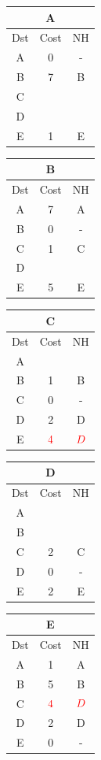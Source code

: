 \documentclass[10pt]{article}
\begin{document}
			\begin{table}[h!]
				\begin{tabular}{|c||c||c|}
					\hline
					\multicolumn{3}{|c|}{A} \\
					\hline
					Dst & Cost & NH \\
					\hline
					A & 0 & - \\
					B & 7 & B \\
					C &   &   \\
					D &   &   \\
					E & 1 & E \\
					\hline
				\end{tabular}
				\begin{tabular}{|c||c||c|}
					\hline
					\multicolumn{3}{|c|}{B} \\
					\hline
					Dst & Cost & NH \\
					\hline
					A & 7 & A \\
					B & 0 & - \\
					C & 1 & C \\
					D &   &   \\
					E & 5 & E \\
					\hline
				\end{tabular}
				\begin{tabular}{|c||c||c|}
					\hline
					\multicolumn{3}{|c|}{C} \\
					\hline
					Dst & Cost & NH \\
					\hline
					A &   &   \\
					B & 1 & B \\
					C & 0 & - \\
					D & 2 & D \\
					E & $\color{red} 4$  & $\color{red} D$ \\
					\hline
				\end{tabular}
				\begin{tabular}{|c||c||c|}
					\hline
					\multicolumn{3}{|c|}{D} \\
					\hline
					Dst & Cost & NH \\
					\hline
					A &   &   \\
					B &   &   \\
					C & 2 & C \\
					D & 0 & - \\
					E & 2 & E \\
					\hline
				\end{tabular}
				\begin{tabular}{|c||c||c|}
					\hline
					\multicolumn{3}{|c|}{E} \\
					\hline
					Dst & Cost & NH \\
					\hline
					A & 1 & A \\
					B & 5 & B \\
					C & $\color{red} 4$  & $\color{red} D$ \\
					D & 2 & D \\
					E & 0 & - \\
					\hline
				\end{tabular}
			\end{table}
\end{document}
